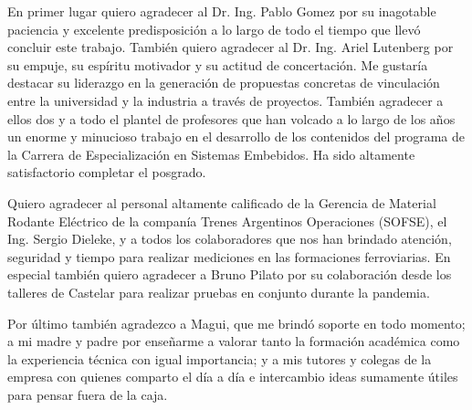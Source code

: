 \documentclass[
11pt, %
spanish,
singlespacing, %
parskip, %
headsepline, %
]{MastersDoctoralThesis} %
\begin{document}
\begin{acknowledgements}
\vspace{1.5cm}

En primer lugar quiero agradecer al Dr. Ing. Pablo Gomez por su inagotable paciencia y excelente predisposición a lo largo de todo el tiempo que llevó concluir este trabajo. También quiero agradecer al Dr. Ing. Ariel Lutenberg por su empuje, su espíritu motivador y su actitud de concertación. Me gustaría destacar su liderazgo en la generación de propuestas concretas de vinculación entre la universidad y la industria a través de proyectos. También agradecer a ellos dos y a todo el plantel de profesores que han volcado a lo largo de los años un enorme y minucioso trabajo en el desarrollo de los contenidos del programa de la Carrera de Especialización en Sistemas Embebidos. Ha sido altamente satisfactorio completar el posgrado.

Quiero agradecer al personal altamente calificado de la Gerencia de Material Rodante Eléctrico de la companía Trenes Argentinos Operaciones (SOFSE), el Ing. Sergio Dieleke, y a todos los colaboradores que nos han brindado atención, seguridad y tiempo para realizar mediciones en las formaciones ferroviarias. En especial también quiero agradecer a Bruno Pilato por su colaboración desde los talleres de Castelar para realizar pruebas en conjunto durante la pandemia. 

Por último también agradezco a Magui, que me brindó soporte en 
todo momento; a mi madre y padre por enseñarme a valorar tanto la formación académica como la experiencia técnica con igual importancia; y a mis tutores y colegas de la empresa con quienes comparto el día a día e intercambio ideas sumamente útiles para pensar fuera de la caja.


\end{acknowledgements}


\tableofcontents %

\listoffigures %

\listoftables %


\end{document}
